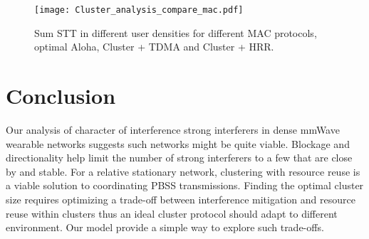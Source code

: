 \documentclass[10pt, conference, letterpaper]{IEEEtran}
\begin{document}
\begin{figure}
	\centering
	\texttt{[image: Cluster\_analysis\_compare\_mac.pdf]}
	\caption{Sum STT in different user densities for different MAC protocols, optimal Aloha, Cluster + TDMA and Cluster + HRR.}
	\label{fig:clusteranalysis:compare_mac}
\end{figure}



\section{Conclusion}\label{section:conclusion}	
Our analysis of character of interference strong interferers in dense mmWave wearable networks suggests such networks might be quite viable. 
Blockage and directionality help limit the number of strong interferers to a few that are close by and stable.
For a relative stationary network, clustering with resource reuse is a viable solution to coordinating PBSS transmissions. 
Finding the optimal cluster size requires optimizing a trade-off between interference mitigation and resource reuse within clusters thus an ideal cluster protocol should adapt to different environment. 
Our model provide a simple way to explore such trade-offs.
\end{document}
